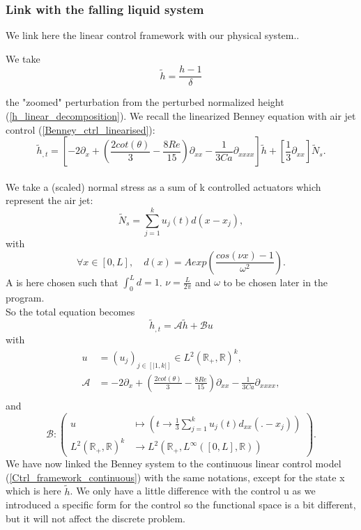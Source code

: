\documentclass[12pt]{article}
\begin{document}
\subsubsection{Link with the falling liquid system}\label{sub_section_link_ctr_FLF}
We link here the linear control framework with our physical system.. 

We take 
\begin{equation}
\tilde{h} = \frac{h-1}{\delta}
\end{equation}

the "zoomed" perturbation from the perturbed normalized height (\ref{h_linear_decomposition}). We recall the linearized Benney equation with air jet control (\ref{Benney_ctrl_linearised}):
$$\tilde{h}_{,t} = \left[ -2\partial_x + (\frac{2cot(\theta)}{3}-\frac{8Re}{15})\partial_{xx} - \frac{1}{3Ca}\partial_{xxxx}\right]\tilde{h} + \left[ \frac{1}{3}\partial_{xx}\right]\tilde{N}_s.$$
\\

We take a (scaled) normal stress as a sum of k controlled actuators which represent the air jet: 
\begin{equation}\label{eq:decomposition_of_the_control}
\boxed{
    \tilde{N}_s = \sum_{j=1}^ku_j(t)d(x-x_j),
}
\end{equation}
with 
\begin{equation}\label{eq:shapefunction_for_airjets}
    \boxed{
    \forall x \in [0,L], \quad d(x)=Aexp\left(\frac{cos(\nu x)-1}{\omega^2}\right).
    }
\end{equation}
A is here chosen such that $\int_0^Ld = 1$. $\nu=\frac{L}{2\pi}$ and $\omega$ to be chosen later in the program.\\


So the total equation becomes
\begin{equation*}
    \tilde{h}_{,t} = \mathcal{A}\tilde{h} + \mathcal{B} u
\end{equation*}
with
\begin{align*}
     u&=(u_j)_{j\in[|1,k|]}\in L^2(\mathbb{R}_+,\mathbb{R})^k, \\
     \mathcal{A}&= -2\partial_x + (\frac{2cot(\theta)}{3}-\frac{8Re}{15})\partial_{xx} - \frac{1}{3Ca}\partial_{xxxx},\\
\end{align*}
and 
\begin{equation*}
         \mathcal{B}: \left(
         \begin{aligned}
             u\ &\mapsto \left( t \rightarrow \frac{1}{3}\sum_{j=1}^ku_j(t)d_{xx}(.-x_j) \right) \\
             L^2(\mathbb{R}_+,\mathbb{R})^k &\rightarrow L^2(\mathbb{R}_+, L^{\infty}([0,L], \mathbb{R}))
         \end{aligned}
         \right).
\end{equation*}
We have now linked the Benney system to the continuous linear control model (\ref{Ctrl_framework_continuous}) with the same notations, 
except for the state x which is here $\tilde{h}$. We only have a little difference with the control u as we introduced a specific
 form for the control so the functional space is a bit different, but it will not affect the discrete problem. \\
\end{document}
